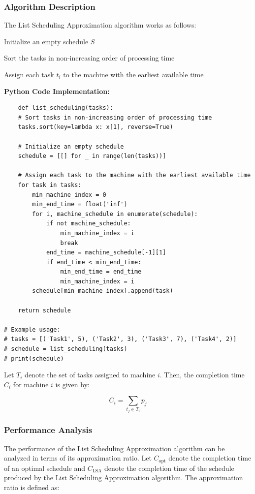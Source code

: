 \documentclass[12pt]{book} %
\begin{document}
\subsubsection{Algorithm Description}
The List Scheduling Approximation algorithm works as follows:
\FloatBarrier
\begin{algorithm}
\caption{List Scheduling Approximation}
\begin{algorithmic}[1]
\item Initialize an empty schedule \(S\)
\item Sort the tasks in non-increasing order of processing time
\item Assign each task \(t_i\) to the machine with the earliest available time
\end{algorithmic}
\end{algorithm}
\FloatBarrier

\textbf{Python Code Implementation:}
\FloatBarrier
\begin{lstlisting}
    def list_scheduling(tasks):
    # Sort tasks in non-increasing order of processing time
    tasks.sort(key=lambda x: x[1], reverse=True)
    
    # Initialize an empty schedule
    schedule = [[] for _ in range(len(tasks))]
    
    # Assign each task to the machine with the earliest available time
    for task in tasks:
        min_machine_index = 0
        min_end_time = float('inf')
        for i, machine_schedule in enumerate(schedule):
            if not machine_schedule:
                min_machine_index = i
                break
            end_time = machine_schedule[-1][1]
            if end_time < min_end_time:
                min_end_time = end_time
                min_machine_index = i
        schedule[min_machine_index].append(task)
    
    return schedule

# Example usage:
# tasks = [('Task1', 5), ('Task2', 3), ('Task3', 7), ('Task4', 2)]
# schedule = list_scheduling(tasks)
# print(schedule)
\end{lstlisting}
\FloatBarrier
Let \(T_i\) denote the set of tasks assigned to machine \(i\). Then, the completion time \(C_i\) for machine \(i\) is given by:

\[
C_i = \sum_{t_j \in T_i} p_j
\]

\subsubsection{Performance Analysis}
The performance of the List Scheduling Approximation algorithm can be analyzed in terms of its approximation ratio. Let \(C_{\text{opt}}\) denote the completion time of an optimal schedule and \(C_{\text{LSA}}\) denote the completion time of the schedule produced by the List Scheduling Approximation algorithm. The approximation ratio is defined as:
\end{document}
